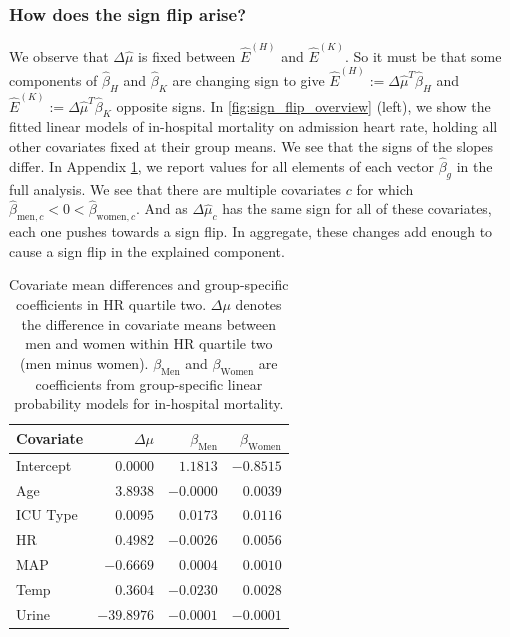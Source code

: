 \subsubsection{How does the sign flip arise?}
\label{appendix:how-does-flip-arise}
We observe that $\Delta\hat{\mu}$ is fixed between $\hat{E}^{(H)}$ and $\hat{E}^{(K)}$. So it must be that some components of $\hat{\beta}_H$ and $\hat{\beta}_K$ are changing sign to give $\hat{E}^{(H)} := \Delta\hat{\mu}^T \hat{\beta}_H$ and $\hat{E}^{(K)} := \Delta\hat{\mu}^T \hat{\beta}_K$ opposite signs.
In \cref{fig:sign_flip_overview} (left), we show the fitted linear models of in-hospital mortality on admission heart rate, holding all other covariates fixed at their group means.
We see that the signs of the slopes differ.
In Appendix \cref{tab:delta_mu_betas}, we report values for all elements of each vector $\hat{\beta}_{g}$ in the full analysis. 
We see that there are multiple covariates $c$ for which $\hat{\beta}_{\textrm{men},c} < 0 < \hat{\beta}_{\textrm{women},c}$.
And as $\Delta\hat{\mu}_c$ has the same sign for all of these covariates, each one pushes towards a sign flip. %
In aggregate, these changes add enough to cause a sign flip in the explained component.

\begin{table}[!ht]
    \caption{Covariate mean differences and group-specific coefficients in HR quartile two. $\Delta\mu$ denotes the difference in covariate means between men and women within HR quartile two (men minus women). $\beta_{\text{Men}}$ and $\beta_{\text{Women}}$ are coefficients from group-specific linear probability models for in-hospital mortality.}
    \label{tab:delta_mu_betas}
    \centering
    \small
    \begin{tabular}{lrrr}
    \toprule
    Covariate 
    & $\Delta\mu$ 
    & $\beta_{\text{Men}}$ 
    & $\beta_{\text{Women}}$ \\
    \midrule
    Intercept & $0.0000$   & $1.1813$  & $-0.8515$ \\
    Age       & $3.8938$   & $-0.0000$ & $0.0039$ \\
    ICU Type  & $0.0095$   & $0.0173$  & $0.0116$ \\
    HR        & $0.4982$   & $-0.0026$ & $0.0056$ \\
    MAP       & $-0.6669$  & $0.0004$  & $0.0010$ \\
    Temp      & $0.3604$   & $-0.0230$ & $0.0028$ \\
    Urine     & $-39.8976$ & $-0.0001$ & $-0.0001$ \\
    \bottomrule
    \end{tabular}
\end{table}

